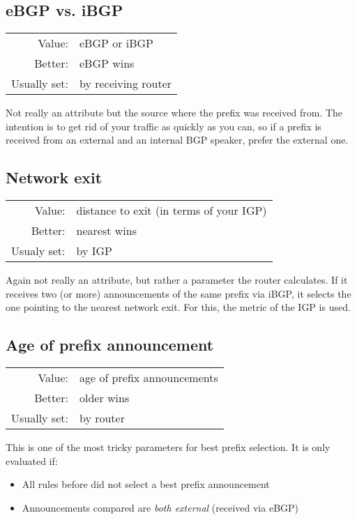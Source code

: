 \subsection{eBGP vs. iBGP}
\begin{tabular}{r p{\linewidth}}
Value: & eBGP or iBGP\\
Better: & eBGP wins \\
Usually set: & by receiving router  \\
\end{tabular}

Not really an attribute but the source where the prefix was received from. The intention is to get rid of your traffic as quickly as you can, so if a prefix is received from an external and an internal BGP speaker, prefer the external one.

\subsection{Network exit}
\begin{tabular}{r p{\linewidth}}
Value: & distance to exit (in terms of your \gls{IGP})\\
Better: & nearest wins \\
Usualy set: & by IGP  \\
\end{tabular}

Again not really an attribute, but rather a parameter the router calculates. If it receives two (or more) announcements of the same prefix via iBGP, it selects the one pointing to the nearest network exit. For this, the metric of the IGP is used.

\subsection{Age of prefix announcement}
\begin{tabular}{r p{\linewidth}}
Value: & age of prefix announcements\\
Better: & older wins \\
Usually set: &  by router \\
\end{tabular}

This is one of the most tricky parameters for best prefix selection. It is only evaluated if:
\begin{itemize}
  \item All rules before did not select a best prefix announcement
  \item Announcements compared are \emph{both external} (received via eBGP)
\end{itemize}

